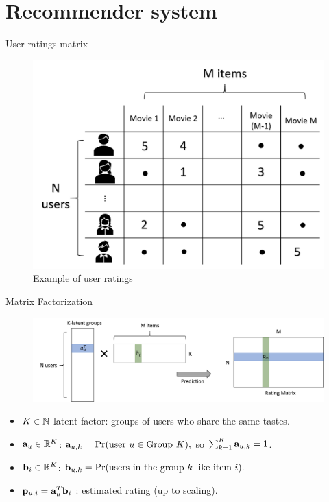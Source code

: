 \documentclass{beamer}
\begin{document}
\section{Recommender system}
\begin{frame}{User ratings matrix}
	\begin{figure}
		\centering
		\includegraphics[width=0.7\linewidth]{fig/ppt-fig1}
		\caption{Example of user ratings}
		\label{fig:ppt-fig1}
	\end{figure}
\end{frame}

\begin{frame}{Matrix Factorization}
	\begin{figure}
		\centering
		\includegraphics[width=0.9\linewidth]{fig/ppt-fig2}
		\label{fig:ppt-fig2}
	\end{figure}
	\begin{itemize}
		\item $K \in \mathbb N$ latent factor: groups of users who share the same tastes.  
		\item $ \mathbf a_u \in \mathbb R^{K} $: $\mathbf a_{u, k} = \Pr(\text{user } u \in \text{Group } K),$ so $ \sum_{k=1}^{K} \mathbf a_{u, k}  = 1$. 
		\item $ \mathbf b_i \in \mathbb R^{K} $: $\mathbf b_{u, k} = \Pr(\text{users in the group } k \text{ like item } i).$
		\item $ \mathbf p_{u, i} = \mathbf a_u^T\mathbf b_i$ : estimated rating (up to scaling).
	\end{itemize}
\end{frame}
\end{document}
